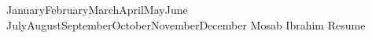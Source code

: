 \newcommand*{\ukdate}{%
	\the\day\space%
	\ifcase\month\or January\or February\or March\or April\or May\or June\or%
		July\or August\or September\or October\or November\or December\fi%
	\space\the\year%
}
\makecvfooter
{\ukdate}
{Mosab Ibrahim Resume}
{\thepage}
